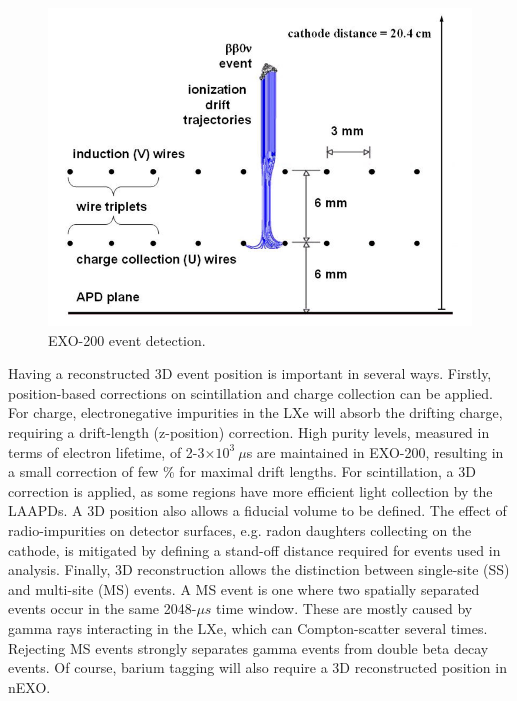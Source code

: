 \begin{figure}[H]
	\centering
	\includegraphics[width=.7\textwidth]{figures/anodecathodedriftcharges.png}
	\caption{EXO-200 event detection.  }
\label{fig:detectionplane}
\end{figure}

Having a reconstructed 3D event position is important in several ways.  Firstly, position-based corrections on scintillation and charge collection can be applied.  For charge, electronegative impurities in the LXe will absorb the drifting charge, requiring a drift-length (z-position) correction.  High purity levels, measured in terms of electron lifetime, of 2-3$\times 10^{3}~\mu$s are maintained in EXO-200, resulting in a small correction of few \% for maximal drift lengths.  For scintillation, a 3D correction is applied, as some regions have more efficient light collection by the LAAPDs.  A 3D position also allows a fiducial volume to be defined.  The effect of radio-impurities on detector surfaces, e.g. radon daughters collecting on the cathode, is mitigated by defining a stand-off distance required for events used in analysis.  Finally, 3D reconstruction allows the distinction between single-site (SS) and multi-site (MS) events.  A MS event is one where two spatially separated events occur in the same 2048-$\mu s$ time window.  These are mostly caused by gamma rays interacting in the LXe, which can Compton-scatter several times.  Rejecting MS events strongly separates gamma events from double beta decay events.  \cite{EXO200TwoNuLong}  Of course, barium tagging will also require a 3D reconstructed position in nEXO.


